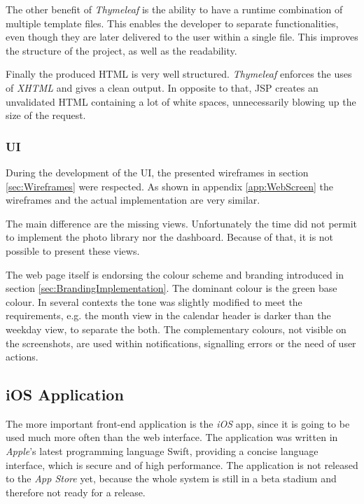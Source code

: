The other benefit of \emph{Thymeleaf} is the ability to have a runtime combination of multiple template files. This enables the developer to separate functionalities, even though they are later delivered to the user within a single file. This improves the structure of the project, as well as the readability.

Finally the produced \gls{HTML} is very well structured. \emph{Thymeleaf} enforces the uses of \emph{XHTML} and gives a clean output. In opposite to that, \gls{JSP} creates an unvalidated \gls{HTML} containing a lot of white spaces, unnecessarily blowing up the size of the request.

\subsubsection{UI}

During the development of the \gls{UI}, the presented wireframes in section \vref{sec:Wireframes} were respected. As shown in appendix \vref{app:WebScreen} the wireframes and the actual implementation are very similar. 

The main difference are the missing views. Unfortunately the time did not permit to implement the photo library nor the dashboard. Because of that, it is not possible to present these views.

The web page itself is endorsing the colour scheme and branding introduced in section \vref{sec:BrandingImplementation}. The dominant colour is the green base colour. In several contexts the tone was slightly modified to meet the requirements, e.g. the month view in the calendar header is darker than the weekday view, to separate the both. The complementary colours, not visible on the screenshots, are used within notifications, signalling errors or the need of user actions.

\subsection{iOS Application}

The more important front-end application is the \emph{iOS} app, since it is going to be used much more often than the web interface. The application was written in \emph{Apple}'s latest programming language \gls{Swift}, providing a concise language interface, which is secure and of high performance. The application is not released to the \emph{App Store} yet, because the whole system is still in a beta stadium and therefore not ready for a release.


